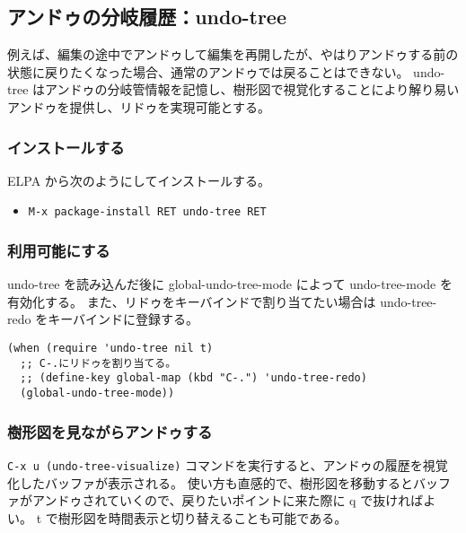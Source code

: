 \subsection{アンドゥの分岐履歴：undo-tree}
例えば、編集の途中でアンドゥして編集を再開したが、やはりアンドゥする前の状態に戻りたくなった場合、通常のアンドゥでは戻ることはできない。
undo-tree はアンドゥの分岐管情報を記憶し、樹形図で視覚化することにより解り易いアンドゥを提供し、リドゥを実現可能とする。
\subsubsection{インストールする}
ELPA から次のようにしてインストールする。
\begin{itemize}\setlength{\leftskip}{-1.00zw}%
\item[] \texttt{M-x package-install RET undo-tree RET}
\end{itemize}
\subsubsection{利用可能にする}
undo-tree を読み込んだ後に global-undo-tree-mode によって undo-tree-mode を有効化する。
また、リドゥをキーバインドで割り当てたい場合は undo-tree-redo をキーバインドに登録する。
\begin{mdframed}[roundcorner=0.50zw,leftmargin=3.00zw,rightmargin=3.00zw,skipabove=0.40zw,skipbelow=0.40zw,innertopmargin=4.00pt,innerbottommargin=4.00pt,innerleftmargin=5.00pt,innerrightmargin=5.00pt,linecolor=gray!020,linewidth=0.50pt,backgroundcolor=gray!20]
\begin{verbatim}
(when (require 'undo-tree nil t)
  ;; C-.にリドゥを割り当てる。
  ;; (define-key global-map (kbd "C-.") 'undo-tree-redo)
  (global-undo-tree-mode))
\end{verbatim}
\end{mdframed}
\subsubsection{樹形図を見ながらアンドゥする}
\texttt{C-x u (undo-tree-visualize)} コマンドを実行すると、アンドゥの履歴を視覚化したバッファが表示される。
使い方も直感的で、樹形図を移動するとバッファがアンドゥされていくので、戻りたいポイントに来た際に q で抜ければよい。
t で樹形図を時間表示と切り替えることも可能である。
